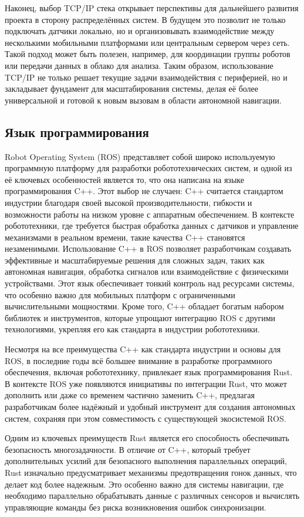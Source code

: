 Наконец, выбор TCP/IP стека открывает перспективы для дальнейшего развития
проекта в сторону распределённых систем. В будущем это позволит не только
подключать датчики локально, но и организовывать взаимодействие между
несколькими мобильными платформами или центральным сервером через сеть. Такой
подход может быть полезен, например, для координации группы роботов или передачи
данных в облако для анализа. Таким образом, использование TCP/IP не только
решает текущие задачи взаимодействия с периферией, но и закладывает фундамент
для масштабирования системы, делая её более универсальной и готовой к новым
вызовам в области автономной навигации.

\subsection{Язык программирования}
Robot Operating System (ROS) представляет собой широко используемую программную
платформу для разработки робототехнических систем, и одной из её ключевых
особенностей является то, что она написана на языке программирования C++. Этот
выбор не случаен: C++ считается стандартом индустрии благодаря своей высокой
производительности, гибкости и возможности работы на низком уровне с аппаратным
обеспечением. В контексте робототехники, где требуется быстрая обработка данных
с датчиков и управление механизмами в реальном времени, такие качества C++
становятся незаменимыми. Использование C++ в ROS позволяет разработчикам
создавать эффективные и масштабируемые решения для сложных задач, таких как
автономная навигация, обработка сигналов или взаимодействие с физическими
устройствами. Этот язык обеспечивает тонкий контроль над ресурсами системы, что
особенно важно для мобильных платформ с ограниченными вычислительными
мощностями. Кроме того, C++ обладает богатым набором библиотек и инструментов,
которые упрощают интеграцию ROS с другими технологиями, укрепляя его как
стандарта в индустрии робототехники.

Несмотря на все преимущества C++ как стандарта индустрии и основы для ROS, в
последние годы всё большее внимание в разработке программного обеспечения,
включая робототехнику, привлекает язык программирования Rust. В контексте ROS
уже появляются инициативы по интеграции Rust, что может дополнить или даже со
временем частично заменить C++, предлагая разработчикам более надёжный и удобный
инструмент для создания автономных систем, сохраняя при этом совместимость с
существующей экосистемой ROS.

Одним из ключевых преимуществ Rust является его способность обеспечивать
безопасность многозадачности. В отличие от C++, который требует дополнительных
усилий для безопасного выполнения параллельных операций, Rust изначально
предусматривает механизмы предотвращения гонок данных, что делает код более
надежным. Это особенно важно для системы навигации, где необходимо параллельно
обрабатывать данные с различных сенсоров и вычислять управляющие команды без
риска возникновения ошибок синхронизации.

